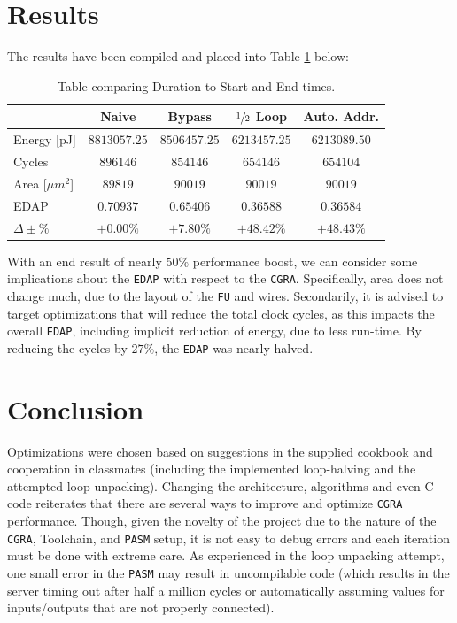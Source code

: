 \documentclass[letterpaper, 10 pt, conference]{ieeeconf}  %
\begin{document}

\section{Results}

The results have been compiled and placed into Table \ref{tab:compare} below:

\begin{table}[ht]
\centering
\caption{Table comparing Duration to Start and End times.}
\label{tab:compare}
\vspace{5pt}
\centering
\begin{tabular}{|l|c|c|c|c|}
\rowcolor[HTML]{C0C0C0}
\hline
 & Naive & Bypass & $\sfrac{1}{2}$ Loop & Auto. Addr. \\ \hline
Energy [pJ] & $8813057.25$  & $8506457.25$ & $6213457.25$ & $6213089.50$ \\ \hline
Cycles & $896146$ & $854146$ & $654146$ & $654104$ \\ \hline
Area [$\mu m^2$] & $89819$ & $90019$ & $90019$ & $90019$ \\ \hline
EDAP & $0.70937$ & $0.65406$ & $0.36588$ & $0.36584$ \\ \hline
$\Delta\pm\%$ & $+0.00\%$ & $+7.80\%$ & $+48.42\%$ & $+48.43\%$ \\ \hline

\end{tabular}
\end{table}

With an end result of nearly $50\%$ performance boost, we can consider some implications about the \texttt{EDAP} with respect to the \texttt{CGRA}. Specifically, area does not change much, due to the layout of the \texttt{FU} and wires. Secondarily, it is advised to target optimizations that will reduce the total clock cycles, as this impacts the overall \texttt{EDAP}, including implicit reduction of energy, due to less run-time. By reducing the cycles by $27\%$, the \texttt{EDAP} was nearly halved.

\section{Conclusion}

Optimizations were chosen based on suggestions in the supplied cookbook and cooperation in classmates (including the implemented loop-halving and the attempted loop-unpacking). Changing the architecture, algorithms and even C-code reiterates that there are several ways to improve and optimize \texttt{CGRA} performance. Though, given the novelty of the project due to the nature of the \texttt{CGRA}, Toolchain, and \texttt{PASM} setup, it is not easy to debug errors and each iteration must be done with extreme care. As experienced in the loop unpacking attempt, one small error in the \texttt{PASM} may result in uncompilable code (which results in the server timing out after half a million cycles or automatically assuming values for inputs/outputs that are not properly connected).
\end{document}
